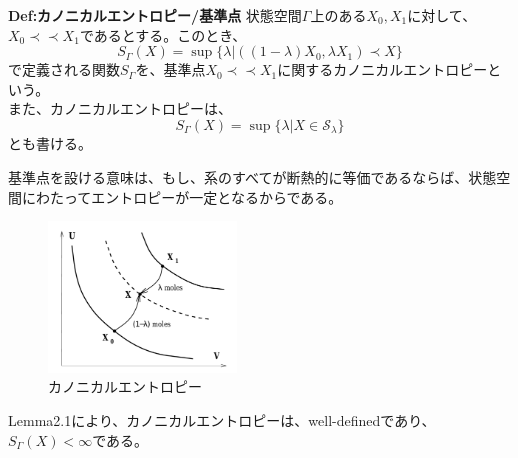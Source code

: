 \documentclass[a4paper,11pt]{jsarticle}
\numberwithin{equation}{section}
\begin{document}
\begin{itembox}[l]{\textbf{Def:カノニカルエントロピー/基準点}}
    状態空間$\Gamma$上のある$X_0,X_1$に対して、$X_0 \prec \prec X_1$であるとする。このとき、
    \begin{equation}
        S_{\Gamma}(X) = \sup\{\lambda|((1-\lambda)X_0,\lambda X_1) \prec X\}
    \end{equation}
    で定義される関数$S_{\Gamma}$を、基準点$X_0 \prec \prec X_1$に関するカノニカルエントロピーという。\\
    また、カノニカルエントロピーは、
    \begin{equation}
        S_{\Gamma}(X) = \sup\{\lambda|X \in \mathcal{S}_{\lambda}\}
    \end{equation}
    とも書ける。
\end{itembox}
基準点を設ける意味は、もし、系のすべてが断熱的に等価であるならば、状態空間にわたってエントロピーが一定となるからである。\\


\begin{figure}[H]
    \begin{center}
    \includegraphics[width=50mm]{fig2.png}
    \end{center}
    \caption{カノニカルエントロピー}
    \label{fig:one}
\end{figure}
Lemma2.1により、カノニカルエントロピーは、well-definedであり、$S_{\Gamma}(X)<\infty$である。\\
\end{document}
